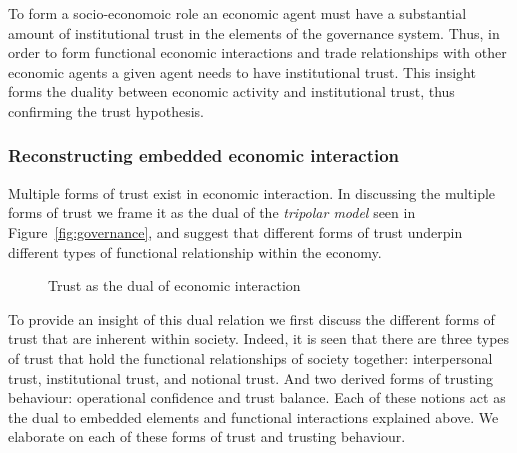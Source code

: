 \begin{subappendices}
To form a socio-economoic role an economic agent must have a substantial amount of institutional trust in the elements of the governance system. Thus, in order to form functional economic interactions and trade relationships with other economic agents a given agent needs to have institutional trust. This insight forms the duality between economic activity and institutional trust, thus confirming the trust hypothesis.

\subsubsection*{Reconstructing embedded economic interaction}

Multiple forms of trust exist in economic interaction. In discussing the multiple forms of trust we frame it as the dual of the \textit{tripolar model} seen in Figure~\ref{fig:governance}, and suggest that different forms of trust underpin different types of functional relationship within the economy.

\begin{figure}[t]
\begin{center}
\end{center}
\caption{Trust as the dual of economic interaction}
\label{dualityoftrust}
\end{figure}

To provide an insight of this dual relation we first discuss the different forms of trust that are inherent within society. Indeed, it is seen that there are three types of trust that hold the functional relationships of society together: interpersonal trust, institutional trust, and notional trust. And two derived forms of trusting behaviour: operational confidence and trust balance. Each of these notions act as the dual to embedded elements and functional interactions explained above. We elaborate on each of these forms of trust and trusting behaviour.


\end{subappendices}
